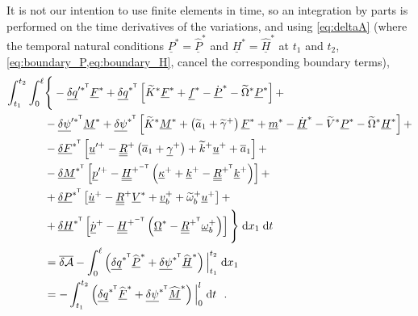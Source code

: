 \documentclass[12pt,a4paper,oneside,english]{abntex2} %
\newcommand{\fix}[1]{{\color{red}#1}}
\newcommand{\vect}[1]{\underline{#1}}
\newcommand{\uvec}[1]{\overline{#1}}
\def\tens#1{\underline{\underline{#1}}}
\def\til#1{\widetilde{#1}}
\def\lb{\left[}
\def\rb{\right]}
\def\lp{\left(}
\def\rp{\right)}
\def\T{\mathsf{T}}
\def\A{\mathcal{A}}
\def\xo{x_1}
\def\aone{\uvec{a}_1}
\def\aonetil{\til{a}_1}
\def\R{\tens{R}}
\def\Rp{\R^+}
\def\RpT{\R^{+^\T}}
\def\u{\vect{u}}
\def\uplus{\u^{+}}
\def\updot{\dot{\u}^{+}}
\def\upprime{\u^{\prime+}}
\def\vb{\vect{v}_b}
\def\vbplus{\vb^{+}}
\def\om{\vect{\omega}_b}
\def\omp{\om^{+}}
\def\omtil{\til{\omega}_b}
\def\omtilp{\omtil^{+}}
\def\gam{\vect{\gamma}}
\def\gamp{\gam^{+}}
\def\gamptil{\til{\gamma}^{+}}
\def\kap{\vect{\kappa}}
\def\kapp{\kap^{+}}
\def\k{\vect{k}}
\def\kp{\k^{+}}
\def\ktil{\til{k}}
\def\ktilp{\ktil^{+}}
\def\Ktil{\til{K}}
\def\Ktils{\Ktil^{*}}
\def\V{\vect{V}}
\def\Vs{\V^{*}}
\def\Vtils{\til{V}^{*}}
\def\Om{\vect{\Omega}}
\def\Oms{\Om^{*}}
\def\Omtil{\til{\Omega}}
\def\Omtils{\Omtil^{*}}
\def\P{\vect{P}}
\def\Ps{\P^*}
\def\Pdots{\dot{\P}^*}
\def\Phats{\widehat{\P}^*}
\def\Hv{\vect{H}}
\def\Hvdot{\dot{\Hv}}
\def\Hvs{\Hv^*}
\def\Hvdots{\Hvdot^*}
\def\Hhats{\widehat{\Hv}^*}
\def\H{\tens{H}}
\def\HpmT{\H^{+^{-\T}}}
\def\p{\vect{p}}
\def\pdot{\dot{\p}}
\def\ppdot{\pdot^{+}}
\def\ppprime{\p^{\prime{+}}}
\def\F{\vect{F}}
\def\Fhat{\widehat{\F}}
\def\Fhats{\Fhat^*}
\def\Fs{\F^*}
\def\M{\vect{M}}
\def\Mhat{\widehat{\M}}
\def\Mhats{\Mhat^*}
\def\Ms{\M^*}
\def\f{\vect{f}}
\def\fs{\f^*}
\def\m{\vect{m}}
\def\ms{\m^*}
\def\delF{\vect{\delta F}}
\def\delM{\vect{\delta M}}
\def\delP{\vect{\delta P}}
\def\delH{\vect{\delta H}}
\def\delFsT{\delF^{*^\T}}
\def\delMsT{\delM^{*^\T}}
\def\delPsT{\delP^{*^\T}}
\def\delHsT{\delH^{*^\T}}
\def\delq{\vect{\delta q}}
\def\delqsT{\delq^{*^\T}}
\def\delqpsT{\delq^{{\prime*}^\T}}
\def\delpsi{\vect{\delta\psi}}
\def\delpsisT{\delpsi^{*^\T}}
\def\delpsipsT{\delpsi^{\prime*^\T}}
\def\intt{\int_{t_1}^{t_2}}
\def\intl{\int_{0}^{\ell}}
\def\d{\textnormal{d}}
\begin{document}
It is not our intention to use finite elements in time, so an integration by parts is performed on the time derivatives of the variations, and using \cref{eq:deltaA} \fix{(where the temporal natural conditions $\Ps=\Phats$ and $\Hvs=\Hhats$ at $t_1$ and $t_2$, \cref{eq:boundary_P,eq:boundary_H}, cancel the corresponding boundary terms)},
\begin{align}
	\intt\intl &\Biggl\{\Biggr. -\delqpsT\Fs + \delqsT\lb\Ktils\Fs+\fs-\Pdots-\Omtils\Ps\rb +
	\nonumber \\
	&-\delpsipsT\Ms + \delpsisT\lb\Ktils\Ms+\lp\aonetil+\gamptil\rp\Fs+\ms-\Hvdots-\Vtils\Ps-\Omtils\Hvs\rb + \nonumber \\
	&-\delFsT\lb\upprime-\Rp\lp\aone+\gamp\rp+\ktilp\uplus+\aone\rb 
	+ \nonumber \\
    &-\delMsT\lb\ppprime-\HpmT\lp\kapp+\kp-\RpT\kp\rp\rb 
	+ \nonumber \\
	&+\delPsT\lb\updot-\Rp\Vs+\vbplus+\omtilp\uplus\rb 
	+ \nonumber \\
	&+\delHsT\lb\ppdot-\HpmT\lp\Oms-\RpT\omp\rp\rb
	\Biggl.\Biggr\}\;\d \xo\;\d t 
	\nonumber \\
	&=\overline{\delta\A} - \intl\lp \delqsT\Phats + \delpsisT\Hhats \rp\Big|_{t_1}^{t_2} \; \d \xo 
	\nonumber \\
	&= - \intt\lp  \delqsT\Fhats + \delpsisT\Mhats \rp\Big|_{0}^{l} \; \d t \ \ .
    \label{eq:hamilton_lagrange4}
\end{align}
\end{document}
